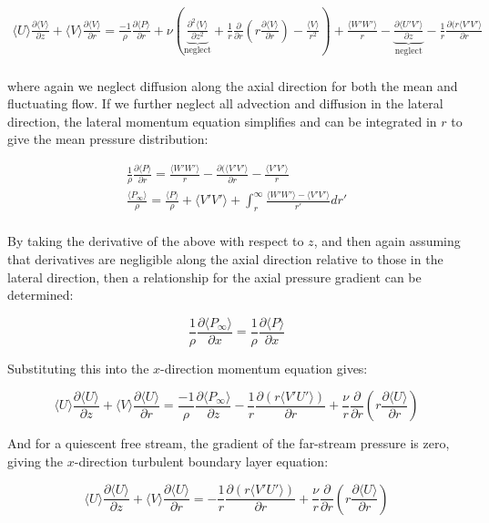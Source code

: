 \documentclass[10pt]{article}
\newcommand{\beq}{\begin{equation}}
\newcommand{\eeq}{\end{equation}}
\newcommand{\beqa}{\begin{equation}\begin{aligned}}
\newcommand{\eeqa}{\end{aligned}\end{equation}}
\newcommand{\la}{\langle}
\newcommand{\ra}{\rangle}
\begin{document}
\begin{flushleft}
\beqa
\la U\ra\frac{\partial \la V\ra}{\partial z}+\la V\ra\frac{\partial\la V\ra}{\partial r}=\frac{-1}{\rho}\frac{\partial \la P\ra}{\partial r}+\nu\left(\underbrace{\frac{\partial^2\la V\ra}{\partial z^2}}_{\textrm{neglect}}+\frac{1}{r}\frac{\partial}{\partial r}\left(r\frac{\partial\la V\ra}{\partial r}\right)-\frac{\la V\ra}{r^2}\right)+\frac{\la W'W'\ra}{r}-\underbrace{\frac{\partial \la U'V'\ra}{\partial z}}_{\textrm{neglect}}-\frac{1}{r}\frac{\partial(r\la V'V'\ra}{\partial r}\\
\eeqa

where again we neglect diffusion along the axial direction for both the mean and fluctuating flow. If we further neglect all advection and diffusion in the lateral direction, the lateral momentum equation simplifies and can be integrated in \(r\) to give the mean pressure distribution:

\beqa
\frac{1}{\rho}\frac{\partial \la P\ra}{\partial r}=\frac{\la W'W'\ra}{r}-\frac{\partial(\la V'V'\ra}{\partial r}-\frac{\la V'V'\ra}{r}\\
\frac{\la P_{\infty}\ra}{\rho}=\frac{\la P\ra}{\rho}+\la V'V'\ra+\int_{r}^{\infty}\frac{\la W'W'\ra - \la V'V'\ra}{r'}dr'\\
\eeqa

By taking the derivative of the above with respect to \(z\), and then again assuming that derivatives are negligible along the axial direction relative to those in the lateral direction, then a relationship for the axial pressure gradient can be determined:

\beq
\frac{1}{\rho}\frac{\partial\la P_{\infty}\ra}{\partial x}=\frac{1}{\rho}\frac{\partial\la P\ra}{\partial x}
\eeq

Substituting this into the \(x\)-direction momentum equation gives:

\beq
\la U\ra\frac{\partial \la U\ra}{\partial z}+\la V\ra\frac{\partial \la U\ra}{\partial r}=\frac{-1}{\rho}\frac{\partial \la P_{\infty}\ra}{\partial z}-\frac{1}{r}\frac{\partial (r\la V'U'\ra)}{\partial r}+\frac{\nu}{r}\frac{\partial}{\partial r}\left(r\frac{\partial\la U\ra}{\partial r}\right)
\eeq

And for a quiescent free stream, the gradient of the far-stream pressure is zero, giving the \(x\)-direction turbulent boundary layer equation:

\beq
\label{eq:BLEx}
\la U\ra\frac{\partial \la U\ra}{\partial z}+\la V\ra\frac{\partial \la U\ra}{\partial r}=-\frac{1}{r}\frac{\partial (r\la V'U'\ra)}{\partial r}+\frac{\nu}{r}\frac{\partial}{\partial r}\left(r\frac{\partial\la U\ra}{\partial r}\right)
\eeq










\end{flushleft}
\end{document}
